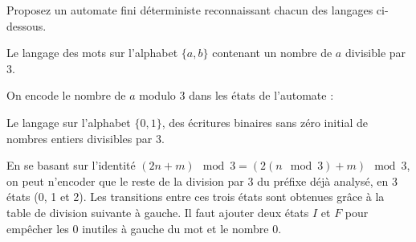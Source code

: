 
\begingroup

\begin{exercice}\label{exo:languages/automata/write_automata}

  Proposez un automate fini déterministe reconnaissant chacun des langages ci-dessous.
  
  \begin{questions}
  \item Le langage des mots sur l'alphabet $\{a,b\}$ contenant un nombre de $a$ divisible par $3$. 
  \end{questions}

  \begin{corrections}
    On encode le nombre de $a$ modulo 3 dans les états de l'automate :

    \begin{center}
    \end{center}
    
  \end{corrections}

  \begin{questions}
  \item Le langage sur l'alphabet $\{0,1\}$, des écritures binaires sans zéro initial de nombres entiers divisibles par $3$. 
  \end{questions}

  \begin{corrections}

    En se basant sur l'identité $(2n + m) \mod 3 = (2(n \mod 3) + m) \mod 3$,
    on peut n'encoder que le reste de la division par 3 du préfixe déjà analysé, en 3 états (0, 1 et 2).
    Les transitions entre ces trois états sont obtenues grâce à la table de division suivante à gauche.
    Il faut ajouter deux états $I$ et $F$ pour empêcher les $0$ inutiles à gauche du mot et le nombre $0$.


\end{corrections}
\end{exercice}
